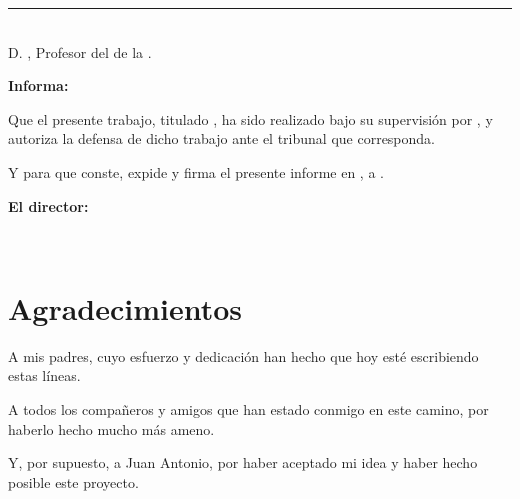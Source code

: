 \noindent\rule[-1ex]{\textwidth}{2pt}\\[4.5ex]

D. \textbf{\myProf}, Profesor del \textbf{\myDepartment} de la \textbf{\myUni}.

\vspace{0.5cm}

\textbf{Informa:}

\vspace{0.5cm}

Que el presente trabajo, titulado \textit{\textbf{\myTitle}}, ha sido realizado bajo su supervisión 
por \textbf{\myName}, y autoriza la defensa de dicho trabajo ante el tribunal que corresponda.

\vspace{0.5cm}

Y para que conste, expide y firma el presente informe en \myLocation, a \myTime.

\vspace{1cm}

\textbf{El director:}

\vspace{5cm}

\noindent \textbf{\myProf\\}

\chapter*{Agradecimientos}
\thispagestyle{empty}

       \vspace{1cm}

A mis padres, cuyo esfuerzo y dedicación han hecho que hoy esté escribiendo estas líneas.

\bigskip
A todos los compañeros y amigos que han estado conmigo en este camino, por haberlo hecho 
mucho más ameno.

\bigskip
Y, por supuesto, a Juan Antonio, por haber aceptado mi idea y haber hecho posible este proyecto.
